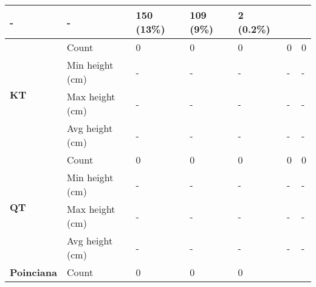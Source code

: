 \begin{longtable}{|p{2cm}|p{2cm}|p{1.5cm}|p{1.5cm}|p{1.5cm}|p{1.5cm}|p{1.5cm}|}
						\multicolumn{1}{l|}{-} & 
						\multicolumn{1}{l|}{-} &
						\multicolumn{1}{l|}{150 (13\%)} & 
						\multicolumn{1}{l|}{109 (9\%)} & 
						\multicolumn{1}{l|}{2 (0.2\%)} \\\cline{2-7}
		\hline    
		\multirow{4}{*}{\textbf{KT}} & 
						\multicolumn{1}{l|}{Count} & 
						\multicolumn{1}{l|}{0} & 
						\multicolumn{1}{l|}{0} &
						\multicolumn{1}{l|}{0} & 
						\multicolumn{1}{l|}{0} &
						\multicolumn{1}{l|}{0} \\\cline{2-7} &
						\multicolumn{1}{l|}{Min height (cm)} & 
						\multicolumn{1}{l|}{-} & 
						\multicolumn{1}{l|}{-} &
						\multicolumn{1}{l|}{-} & 
						\multicolumn{1}{l|}{-} &
						\multicolumn{1}{l|}{-} \\\cline{2-7} &
						\multicolumn{1}{l|}{Max height (cm)} & 
						\multicolumn{1}{l|}{-} & 
						\multicolumn{1}{l|}{-} &
						\multicolumn{1}{l|}{-} & 
						\multicolumn{1}{l|}{-} &
						\multicolumn{1}{l|}{-} \\\cline{2-7} &
						\multicolumn{1}{l|}{Avg height (cm)} & 
						\multicolumn{1}{l|}{-} & 
						\multicolumn{1}{l|}{-} &
						\multicolumn{1}{l|}{-} & 
						\multicolumn{1}{l|}{-} & 
						\multicolumn{1}{l|}{-} \\\cline{2-7}
		\hline    
		\multirow{4}{*}{\textbf{QT}} & 
						\multicolumn{1}{l|}{Count} & 
						\multicolumn{1}{l|}{0} & 
						\multicolumn{1}{l|}{0} &
						\multicolumn{1}{l|}{0} & 
						\multicolumn{1}{l|}{0} &
						\multicolumn{1}{l|}{0} \\\cline{2-7} &
						\multicolumn{1}{l|}{Min height (cm)} & 
						\multicolumn{1}{l|}{-} & 
						\multicolumn{1}{l|}{-} &
						\multicolumn{1}{l|}{-} & 
						\multicolumn{1}{l|}{-} &
						\multicolumn{1}{l|}{-} \\\cline{2-7} &
						\multicolumn{1}{l|}{Max height (cm)} & 
						\multicolumn{1}{l|}{-} & 
						\multicolumn{1}{l|}{-} &
						\multicolumn{1}{l|}{-} & 
						\multicolumn{1}{l|}{-} &
						\multicolumn{1}{l|}{-} \\\cline{2-7} &
						\multicolumn{1}{l|}{Avg height (cm)} & 
						\multicolumn{1}{l|}{-} & 
						\multicolumn{1}{l|}{-} &
						\multicolumn{1}{l|}{-} & 
						\multicolumn{1}{l|}{-} & 
						\multicolumn{1}{l|}{-} \\\cline{2-7}
		\hline    
		\multirow{4}{*}{\textbf{Poinciana}} & 
						\multicolumn{1}{l|}{Count} & 
						\multicolumn{1}{l|}{0} & 
						\multicolumn{1}{l|}{0} &
						\multicolumn{1}{l|}{0} & 

\end{longtable}
